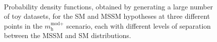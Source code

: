 \begin{figure}[h!]
\begin{center}
~\\
\end{center}
\caption{Probability density functions, obtained by generating a large number of toy datasets, for the SM and MSSM hypotheses at three different points in the $m_{\text{h}}^{\text{mod+}}$
scenario, each with different levels of separation between the MSSM and SM distributions.}
\label{fig:mssm_mssmvssm_toys}
\end{figure}

